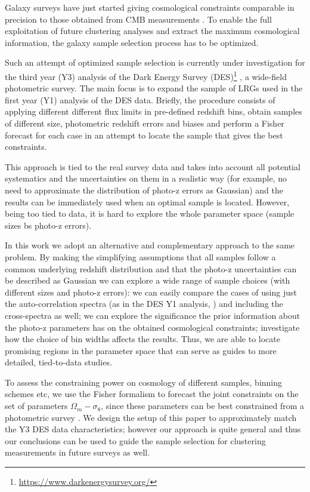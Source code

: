 \documentclass[a4paper,fleqn,usenatbib]{mnras}
\begin{document}
Galaxy surveys have just started giving cosmological constraints comparable in precision to those obtained from CMB measurements \citep{DES1,Joudaki2018}. To enable the full exploitation of future clustering analyses and extract the maximum cosmological information, the galaxy sample selection process has to be optimized.  

Such an attempt of optimized sample selection is currently under investigation for the third year (Y3) analysis of the Dark Energy Survey (DES)\footnote{\url{https://www.darkenergysurvey.org/}} \citep{DES2005}, a wide-field photometric survey. The main focus is to expand the sample of LRGs used in the first year (Y1) analysis of the DES data. Briefly, the procedure consists of applying different different flux limits in pre-defined redshift bins, obtain samples of different size, photometric redshift errors and biases and perform a Fisher forecast for each case in an attempt to  locate the sample that gives the best constraints.
 
This approach is tied to the real survey data and takes into account all potential systematics and the uncertainties on them in a realistic way (for example, no need to approximate the distribution of photo-z errors as Gaussian) and the results can be immediately used when an optimal sample is located. However, being too tied to data, it is hard to explore the  whole parameter space (sample sizes bs photo-z errors).

In this work we adopt an alternative and complementary approach to the same problem. By making the simplifying assumptions that all samples follow a common underlying redshift distribution and that the photo-z uncertainties can be described as  Gaussian we can explore a wide range of sample choices (with different sizes and photo-z errors): we can easily compare the cases of using just the auto-correlation spectra (as in the DES Y1 analysis, \citealt{DES1}) and including the cross-spectra as well; we can explore the significance the prior information about the photo-z parameters has on the obtained cosmological constraints; investigate  how the choice of bin widths affects the results. Thus, we are able to locate  promising regions in the parameter space that can serve as guides to more detailed, tied-to-data studies. 

To assess the constraining power on cosmology of different samples, binning schemes etc, we use the Fisher formalism to forecast the joint constraints on the set of parameters $\Omega_m - \sigma_8$,  since these parameters can be best constrained from a photometric survey \citep{DES1}. We design the setup of this paper to approximately match the Y3 DES data characteristics; however our approach is quite general and thus our conclusions can be used to guide the sample selection for clustering measurements in future surveys as well. 
\end{document}

